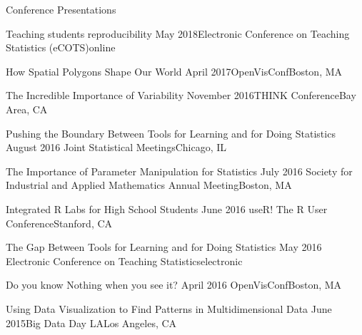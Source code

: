 \documentclass{resume} %
\begin{document}
\begin{rSection}{Conference Presentations}

\begin{sSubsection}{Teaching students reproducibility}{ }{May 2018}{Electronic Conference on Teaching Statistics (eCOTS)}{online}
\end{sSubsection}

\begin{sSubsection}{How Spatial Polygons Shape Our World}{ }{April 2017}{OpenVisConf}{Boston, MA}
\end{sSubsection}

\begin{sSubsection}{The Incredible Importance of Variability}{ }{November 2016}{THINK Conference}{Bay Area, CA}
\end{sSubsection}

\begin{sSubsection}{Pushing the Boundary Between Tools for Learning and for Doing Statistics}{ }{August 2016 }{Joint Statistical Meetings}{Chicago, IL}
\end{sSubsection}

\begin{sSubsection}{The Importance of Parameter Manipulation for Statistics}{ }{July 2016 }{Society for Industrial and Applied Mathematics Annual Meeting}{Boston, MA}
\end{sSubsection}

\begin{sSubsection}{Integrated R Labs for High School Students}{ }{June 2016 }{useR! The R User Conference}{Stanford, CA}
\end{sSubsection}

\begin{sSubsection}{The Gap Between Tools for Learning and for Doing Statistics}{ }{May 2016 }{Electronic Conference on Teaching Statistics}{electronic}
\end{sSubsection}

\begin{sSubsection}{Do you know Nothing when you see it?}{ }{April 2016 }{OpenVisConf}{Boston, MA}
\end{sSubsection}

\begin{sSubsection}{Using Data Visualization to Find Patterns in Multidimensional Data}{ }{June 2015}{Big Data Day LA}{Los Angeles, CA}
\end{sSubsection}


\end{rSection}
\end{document}
